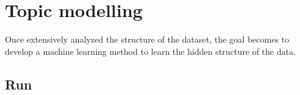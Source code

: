 \chapter{Topic modelling}\label{ch:topicmodelling}
Once extensively analyzed the structure of the dataset, the goal becomes to develop a machine learning method to learn the hidden structure of the data.









\clearpage
\section{Run}


\clearpage


\clearpage
